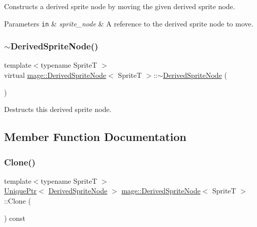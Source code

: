 Constructs a derived sprite node by moving the given derived sprite node.


\begin{DoxyParams}[1]{Parameters}
\mbox{\tt in}  & {\em sprite\+\_\+node} & A reference to the derived sprite node to move. \\
\hline
\end{DoxyParams}
\hypertarget{classmage_1_1_derived_sprite_node_a0ff9a3b661a72ae3d200dfe50dc311fc}{}\label{classmage_1_1_derived_sprite_node_a0ff9a3b661a72ae3d200dfe50dc311fc} 
\subsubsection{\texorpdfstring{$\sim$\+Derived\+Sprite\+Node()}{~DerivedSpriteNode()}}
{\footnotesize\ttfamily template$<$typename SpriteT $>$ \\
virtual \hyperlink{classmage_1_1_derived_sprite_node}{mage\+::\+Derived\+Sprite\+Node}$<$ SpriteT $>$\+::$\sim$\hyperlink{classmage_1_1_derived_sprite_node}{Derived\+Sprite\+Node} (\begin{DoxyParamCaption}{ }\end{DoxyParamCaption})\hspace{0.3cm}{\ttfamily [virtual]}}

Destructs this derived sprite node. 

\subsection{Member Function Documentation}
\hypertarget{classmage_1_1_derived_sprite_node_a3a409447de581b0ed39625a9d3beab33}{}\label{classmage_1_1_derived_sprite_node_a3a409447de581b0ed39625a9d3beab33} 
\subsubsection{\texorpdfstring{Clone()}{Clone()}}
{\footnotesize\ttfamily template$<$typename SpriteT $>$ \\
\hyperlink{namespacemage_a3316d7143a973e37adf1110f2e80ca31}{Unique\+Ptr}$<$ \hyperlink{classmage_1_1_derived_sprite_node}{Derived\+Sprite\+Node} $>$ \hyperlink{classmage_1_1_derived_sprite_node}{mage\+::\+Derived\+Sprite\+Node}$<$ SpriteT $>$\+::Clone (\begin{DoxyParamCaption}{ }\end{DoxyParamCaption}) const}

